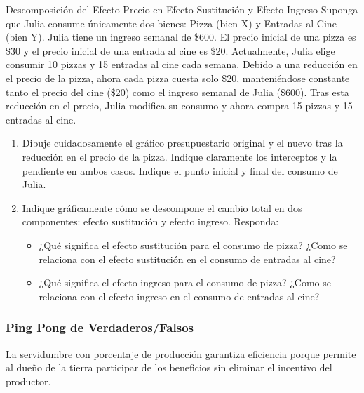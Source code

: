 \documentclass{beamer}
\begin{document}
\begin{frame}{Descomposición del Efecto Precio en Efecto Sustitución y Efecto Ingreso}
    \scriptsize
    Suponga que Julia consume únicamente dos bienes: Pizza (bien X) y Entradas al Cine (bien Y). Julia tiene un ingreso semanal de \$600. El precio inicial de una pizza es \$30 y el precio inicial de una entrada al cine es \$20. Actualmente, Julia elige consumir 10 pizzas y 15 entradas al cine cada semana.
    Debido a una reducción en el precio de la pizza, ahora cada pizza cuesta solo \$20, manteniéndose constante tanto el precio del cine (\$20) como el ingreso semanal de Julia (\$600). Tras esta reducción en el precio, Julia modifica su consumo y ahora compra 15 pizzas y 15 entradas al cine.
    \begin{enumerate}
        \item Dibuje cuidadosamente el gráfico presupuestario original y el nuevo tras la reducción en el precio de la pizza. Indique claramente los interceptos y la pendiente en ambos casos. Indique el punto inicial y final del consumo de Julia.
        \item Indique gráficamente cómo se descompone el cambio total en dos componentes: efecto sustitución y efecto ingreso. Responda:
        \begin{itemize}
            \scriptsize
            \item ¿Qué significa el efecto sustitución para el consumo de pizza? ¿Como se relaciona con el efecto sustitución en el consumo de entradas al cine?
            \item ¿Qué significa el efecto ingreso para el consumo de pizza? ¿Como se relaciona con el efecto ingreso en el consumo de entradas al cine?
        \end{itemize}
    \end{enumerate}
\end{frame}

\begin{frame}
\frametitle{Ping Pong de Verdaderos/Falsos}
    \centering

    La servidumbre con porcentaje de producción garantiza eficiencia porque permite al dueño de la tierra participar de los beneficios sin eliminar el incentivo del productor.

\end{frame}
\end{document}
